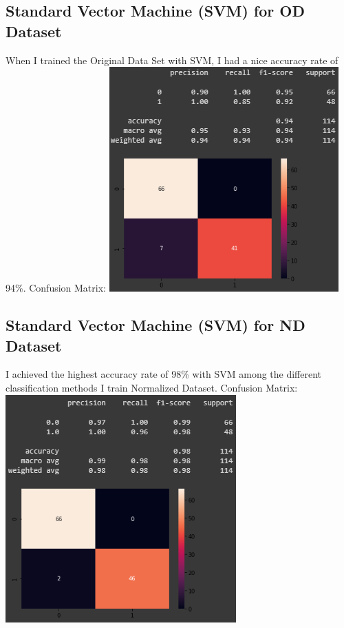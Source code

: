 \documentclass[a4 paper]{article}
\begin{document}
    \subsection{Standard Vector Machine (SVM) for OD Dataset}
    When I trained the Original Data Set with SVM, I had a nice accuracy rate of 94\%.
    \newline Confusion Matrix:
    \newline \includegraphics[scale=0.75]{confussion_od.png}
    \subsection{Standard Vector Machine (SVM) for ND Dataset}
    I achieved the highest accuracy rate of 98\% with SVM among the different classification methods I train Normalized Dataset.
    \newline Confusion Matrix:
    \newline \includegraphics[scale=0.75]{confussion_nd.png}
\end{document}
